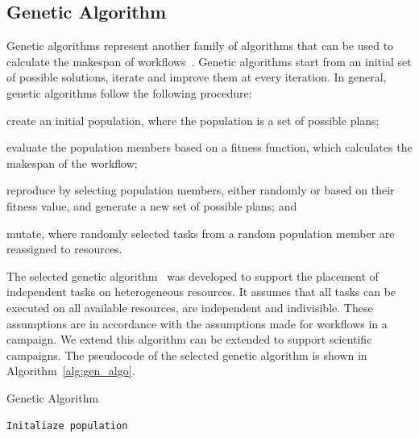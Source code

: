 \subsection{Genetic Algorithm}
\label{algo:gen}
Genetic algorithms represent another family of algorithms that can be  used to calculate the makespan of workflows~\cite{dong2006scheduling}.
Genetic algorithms start from an initial set of possible solutions, iterate and improve them at every iteration.
In general, genetic algorithms follow the following procedure:
\begin{inparaenum}[(i)]
    \item create an initial population, where the population is a set of possible plans;
    \item evaluate the population members based on a fitness function, which calculates the makespan of the workflow;
    \item reproduce by selecting population members, either randomly or based on their fitness value, and generate a new set of possible plans; and
    \item mutate, where randomly selected tasks from a random population member are reassigned to resources.%
\end{inparaenum}

The selected genetic algorithm~\cite{page2005algorithm} was developed to support the placement of independent tasks on heterogeneous resources.
It assumes that all tasks can be executed on all available resources, are independent and indivisible.
These assumptions are in accordance with the assumptions made for workflows in a campaign.
We extend this algorithm can be extended to support scientific campaigns.
The pseudocode of the selected genetic algorithm is shown in Algorithm~\ref{alg:gen_algo}.

\begin{algorithm}[t]
    \caption{Genetic Algorithm}
    \label{alg:gen_algo}
    \scriptsize
    \begin{algorithmic}[1]
        \State \texttt{Initaliaze population}
        \EndWhile
        \EndProcedure
    \end{algorithmic}
\end{algorithm}

